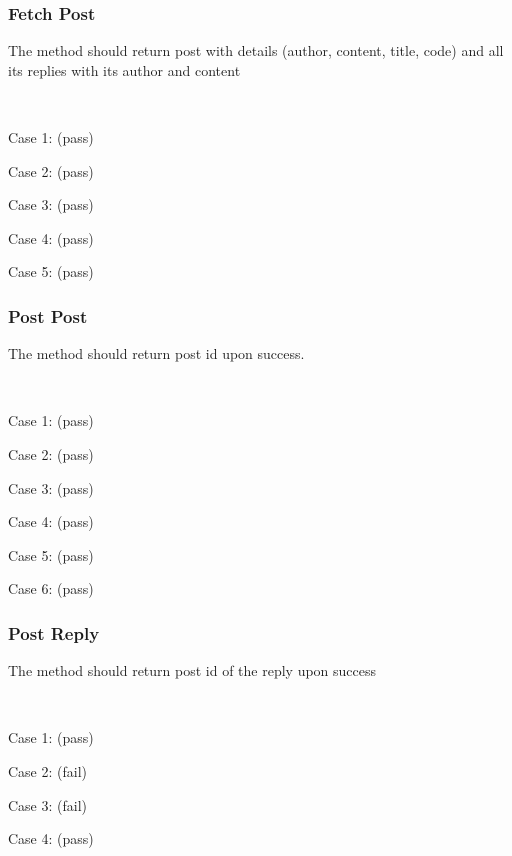 \subsubsection{Fetch Post}
The method should return post with details (author, content, title, code) and all its replies with its author and content

~

Case 1: (pass)


Case 2: (pass)


Case 3: (pass)


Case 4: (pass)


Case 5: (pass)


\subsubsection{Post Post}
The method should return post id upon success.

~

Case 1: (pass)


Case 2: (pass)


Case 3: (pass)


Case 4: (pass)


Case 5: (pass)


Case 6: (pass)


\subsubsection{Post Reply}
The method should return post id of the reply upon success

~

Case 1: (pass)


Case 2: (fail)


Case 3: (fail)


Case 4: (pass)


